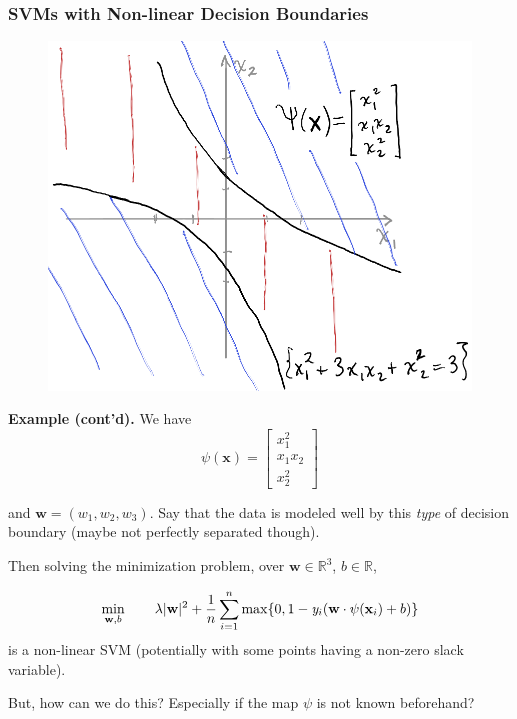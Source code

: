 \documentclass[smaller]{beamer}
\theoremstyle{example}
\newcommand{\x}{\textbf{x}}
\newcommand{\ix}[1]{{\it #1}}
\begin{document}
\begin{frame}
    \frametitle{SVMs with Non-linear Decision Boundaries}
    
    \medskip
    \begin{minipage}{\textwidth}
        \begin{figure}
            \centering
            \includegraphics[height=0.35\textheight]{../../Images/kernel-figure.png}
        \end{figure}

    \textbf{Example (cont'd).} We have 
    \[\psi(\x) = \begin{bmatrix}x_1^2 \\ x_1x_2 \\ x_2^2\end{bmatrix}\]
    
    \vspace{-6pt}
    and $\textbf{w} = (w_1, w_2, w_3)$. Say that the data is modeled well by this \textit{type} of decision boundary (maybe not perfectly separated though).
    
    \pause
    Then solving the minimization problem, over $\textbf{w}\in\mathbb R^3$, $b\in\mathbb R$,
    \end{minipage}

    \medskip
        \[\min_{\textbf{w},b} \qquad\lambda|\textbf{w}|^2 + \frac{1}{n}\sum_{i=1}^n\max\{0, 1 - \ix y_i(\textbf{w}\cdot\psi(\x_i) + b)\}\]
    is a non-linear SVM (potentially with some points having a non-zero slack variable).
    
    \pause
    But, how can we do this? Especially if the map $\psi$ is not known beforehand?
\end{frame}
\end{document}
